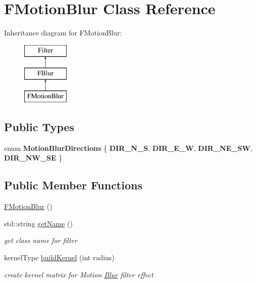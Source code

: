 \hypertarget{classFMotionBlur}{}\section{F\+Motion\+Blur Class Reference}
\label{classFMotionBlur}
Inheritance diagram for F\+Motion\+Blur\+:\begin{figure}[H]
\begin{center}
\leavevmode
\includegraphics[height=3.000000cm]{classFMotionBlur}
\end{center}
\end{figure}
\subsection*{Public Types}
\begin{DoxyCompactItemize}
\item 
enum {\bfseries Motion\+Blur\+Directions} \{ {\bfseries D\+I\+R\+\_\+\+N\+\_\+S}, 
{\bfseries D\+I\+R\+\_\+\+E\+\_\+W}, 
{\bfseries D\+I\+R\+\_\+\+N\+E\+\_\+\+SW}, 
{\bfseries D\+I\+R\+\_\+\+N\+W\+\_\+\+SE}
 \}\hypertarget{classFMotionBlur_a9feb57cbbbe68a1977f9e565b34ba2a6}{}\label{classFMotionBlur_a9feb57cbbbe68a1977f9e565b34ba2a6}

\end{DoxyCompactItemize}
\subsection*{Public Member Functions}
\begin{DoxyCompactItemize}
\item 
\hyperlink{classFMotionBlur_a670df8e9b43ff1ff3b262b6d48b944cf}{F\+Motion\+Blur} ()
\item 
std\+::string \hyperlink{classFMotionBlur_aeb40f52478dcf27d5fa8fec4aa473975}{get\+Name} ()\hypertarget{classFMotionBlur_aeb40f52478dcf27d5fa8fec4aa473975}{}\label{classFMotionBlur_aeb40f52478dcf27d5fa8fec4aa473975}

\begin{DoxyCompactList}\small\item\em get class name for filter \end{DoxyCompactList}\item 
kernel\+Type \hyperlink{classFMotionBlur_a105abc618c4fe5ddd890ad2ff1836979}{build\+Kernel} (int radius)\hypertarget{classFMotionBlur_a105abc618c4fe5ddd890ad2ff1836979}{}\label{classFMotionBlur_a105abc618c4fe5ddd890ad2ff1836979}

\begin{DoxyCompactList}\small\item\em create kernel matrix for Motion \hyperlink{classBlur}{Blur} filter effect \end{DoxyCompactList}\end{DoxyCompactItemize}


